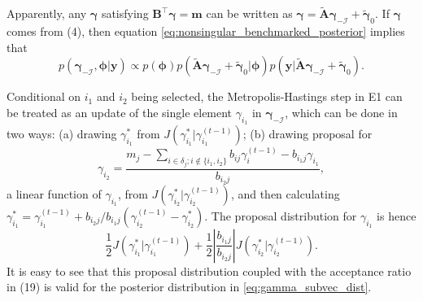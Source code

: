 \documentclass[12pt]{article}
\begin{document}
Apparently, any $\bm{\gamma}$ satisfying $\bm{B}^{\top}\bm{\gamma}=\bm{m}$ can be written as $\bm{\gamma}=\widetilde{\bm{A}}\bm{\gamma}_{-\mathcal{I}}+\widetilde{\bm{\gamma}}_0$. If $\bm{\gamma}$ comes from (4), then equation \eqref{eq:nonsingular_benchmarked_posterior}
implies that
\begin{equation}\label{eq:gamma_subvec_dist}
p(\bm{\gamma}_{-\mathcal{I}},\bm{\phi}|\bm{y})\propto p(\bm{\phi}) p(\widetilde{\bm{A}}\bm{\gamma}_{-\mathcal{I}}+\widetilde{\bm{\gamma}}_0 | \bm{\phi}) p(\bm{y} | \widetilde{\bm{A}}\bm{\gamma}_{-\mathcal{I}}+\widetilde{\bm{\gamma}}_0).
\end{equation}

Conditional on $i_1$ and $i_2$ being selected, the Metropolis-Hastings step in E1 can be treated as an update of the single element $\gamma_{i_1}$ in $\bm{\gamma}_{-\mathcal{I}}$, which can be done in two ways: (a) drawing $\gamma_{i_1}^*$ from $J(\gamma_{i_1}^*|\gamma_{i_1}^{(t-1)})$; (b) drawing proposal for
\begin{equation*}
\gamma_{i_2}=\frac{m_j-\sum_{i\in\delta_j;i\notin\{i_1,i_2\}}b_{ij}\gamma_{i}^{(t-1)}-b_{i_1j}\gamma_{i_1}}{b_{i_2j}},
\end{equation*}
a linear function of $\gamma_{i_1}$, from $J(\gamma_{i_2}^*|\gamma_{i_2}^{(t-1)})$, and then calculating $\gamma_{i_1}^*=\gamma_{i_1}^{(t-1)}+b_{i_2 j}/b_{i_1 j}\left(\gamma_{i_2}^{(t-1)}-\gamma_{i_2}^*\right)$.  The proposal distribution for $\gamma_{i_1}$ is hence
\begin{equation*}
\frac{1}{2}J(\gamma_{i_1}^*|\gamma_{i_1}^{(t-1)})+\frac{1}{2}\left|\frac{b_{i_1j}}{b_{i_2j}}\right|J(\gamma_{i_2}^*|\gamma_{i_2}^{(t-1)}).
\end{equation*}
It is easy to see that this proposal distribution coupled with the acceptance ratio in (19) is valid for the posterior distribution in \eqref{eq:gamma_subvec_dist}.
\end{document}
